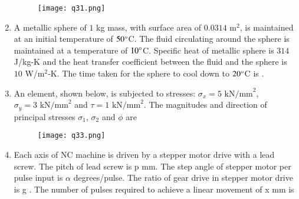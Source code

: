 \documentclass[journal,12pt,onecolumn]{IEEEtran}
\theoremstyle{remark}
\begin{document}
\begin{enumerate}
    \begin{figure}[H]
        \centering
        \texttt{[image: q31.png]}
        \caption*{}
        \label{fig:q31}
    \end{figure}
    
    \hfill{}
    
    \item A metallic sphere of $1$ kg mass, with surface area of $0.0314 \text{ m}^2$, is maintained at an initial temperature of $50\degree$C. The fluid circulating around the sphere is maintained at a temperature of $10\degree$C. Specific heat of metallic sphere is $314$ J/kg-K and the heat transfer coefficient between the fluid and the sphere is $10$ W/m$^2$-K. The time taken  for the sphere to cool down to $20\degree$C is \underline{\hspace{2cm}}.
    
    \hfill{}

    \item An element, shown below, is subjected to stresses: $\sigma_x = 5 \text{ kN/mm}^2$, $\sigma_y = 3 \text{ kN/mm}^2$ and $\tau = 1 \text{ kN/mm}^2$. The magnitudes and direction of principal stresses $\sigma_1$, $\sigma_2$  and $\phi$  are
    
    \begin{figure}[H]
        \centering
        \texttt{[image: q33.png]}
        \caption*{}
        \label{fig:q33}
    \end{figure}
    
    \hfill{}
    \begin{enumerate}
    \end{enumerate}

    \item Each axis of NC machine is driven by a stepper motor drive with a lead screw. The pitch of lead screw is p mm. The step angle of stepper motor per pulse input is $\alpha$ degrees/pulse. The ratio of gear drive in stepper motor drive is g . The number of pulses required to achieve a linear movement of x mm is
    

\end{enumerate}
\end{document}
